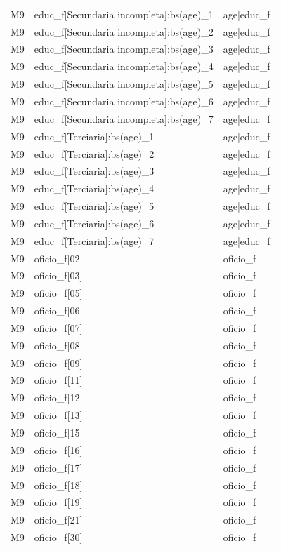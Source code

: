 \begin{longtable}{lll}
M9 & educ\_f[Secundaria incompleta]:bs(age)\_1 & age|educ\_f \\
M9 & educ\_f[Secundaria incompleta]:bs(age)\_2 & age|educ\_f \\
M9 & educ\_f[Secundaria incompleta]:bs(age)\_3 & age|educ\_f \\
M9 & educ\_f[Secundaria incompleta]:bs(age)\_4 & age|educ\_f \\
M9 & educ\_f[Secundaria incompleta]:bs(age)\_5 & age|educ\_f \\
M9 & educ\_f[Secundaria incompleta]:bs(age)\_6 & age|educ\_f \\
M9 & educ\_f[Secundaria incompleta]:bs(age)\_7 & age|educ\_f \\
M9 & educ\_f[Terciaria]:bs(age)\_1 & age|educ\_f \\
M9 & educ\_f[Terciaria]:bs(age)\_2 & age|educ\_f \\
M9 & educ\_f[Terciaria]:bs(age)\_3 & age|educ\_f \\
M9 & educ\_f[Terciaria]:bs(age)\_4 & age|educ\_f \\
M9 & educ\_f[Terciaria]:bs(age)\_5 & age|educ\_f \\
M9 & educ\_f[Terciaria]:bs(age)\_6 & age|educ\_f \\
M9 & educ\_f[Terciaria]:bs(age)\_7 & age|educ\_f \\
M9 & oficio\_f[02] & oficio\_f \\
M9 & oficio\_f[03] & oficio\_f \\
M9 & oficio\_f[05] & oficio\_f \\
M9 & oficio\_f[06] & oficio\_f \\
M9 & oficio\_f[07] & oficio\_f \\
M9 & oficio\_f[08] & oficio\_f \\
M9 & oficio\_f[09] & oficio\_f \\
M9 & oficio\_f[11] & oficio\_f \\
M9 & oficio\_f[12] & oficio\_f \\
M9 & oficio\_f[13] & oficio\_f \\
M9 & oficio\_f[15] & oficio\_f \\
M9 & oficio\_f[16] & oficio\_f \\
M9 & oficio\_f[17] & oficio\_f \\
M9 & oficio\_f[18] & oficio\_f \\
M9 & oficio\_f[19] & oficio\_f \\
M9 & oficio\_f[21] & oficio\_f \\
M9 & oficio\_f[30] & oficio\_f \\

\end{longtable}
